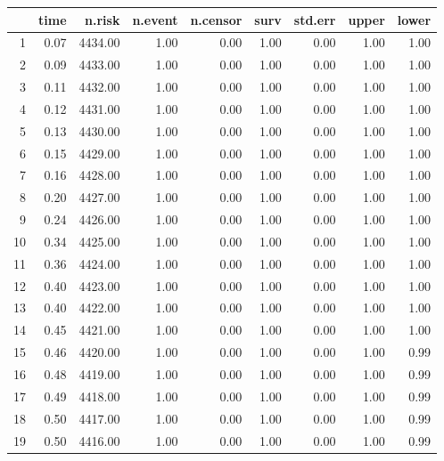 \documentclass{article}\usepackage[]{graphicx}\usepackage[]{color}
\makeatletter
\newenvironment{kframe}{%
 \def\at@end@of@kframe{}%
 \ifinner\ifhmode%
  \def\at@end@of@kframe{\end{minipage}}%
  \begin{minipage}{\columnwidth}%
 \fi\fi%
 \def\FrameCommand##1{\hskip\@totalleftmargin \hskip-\fboxsep
 \colorbox{shadecolor}{##1}\hskip-\fboxsep
     \hskip-\linewidth \hskip-\@totalleftmargin \hskip\columnwidth}%
 \MakeFramed {\advance\hsize-\width
   \@totalleftmargin\z@ \linewidth\hsize
   \@setminipage}}%
 {\par\unskip\endMakeFramed%
 \at@end@of@kframe}
\makeatother
\begin{document}
\begin{kframe}


{\ttfamily\noindent{}}\end{kframe}%
\begin{longtable}{rrrrrrrrr}
  \hline
 & time & n.risk & n.event & n.censor & surv & std.err & upper & lower \\ 
  \hline
1 & 0.07 & 4434.00 & 1.00 & 0.00 & 1.00 & 0.00 & 1.00 & 1.00 \\ 
  2 & 0.09 & 4433.00 & 1.00 & 0.00 & 1.00 & 0.00 & 1.00 & 1.00 \\ 
  3 & 0.11 & 4432.00 & 1.00 & 0.00 & 1.00 & 0.00 & 1.00 & 1.00 \\ 
  4 & 0.12 & 4431.00 & 1.00 & 0.00 & 1.00 & 0.00 & 1.00 & 1.00 \\ 
  5 & 0.13 & 4430.00 & 1.00 & 0.00 & 1.00 & 0.00 & 1.00 & 1.00 \\ 
  6 & 0.15 & 4429.00 & 1.00 & 0.00 & 1.00 & 0.00 & 1.00 & 1.00 \\ 
  7 & 0.16 & 4428.00 & 1.00 & 0.00 & 1.00 & 0.00 & 1.00 & 1.00 \\ 
  8 & 0.20 & 4427.00 & 1.00 & 0.00 & 1.00 & 0.00 & 1.00 & 1.00 \\ 
  9 & 0.24 & 4426.00 & 1.00 & 0.00 & 1.00 & 0.00 & 1.00 & 1.00 \\ 
  10 & 0.34 & 4425.00 & 1.00 & 0.00 & 1.00 & 0.00 & 1.00 & 1.00 \\ 
  11 & 0.36 & 4424.00 & 1.00 & 0.00 & 1.00 & 0.00 & 1.00 & 1.00 \\ 
  12 & 0.40 & 4423.00 & 1.00 & 0.00 & 1.00 & 0.00 & 1.00 & 1.00 \\ 
  13 & 0.40 & 4422.00 & 1.00 & 0.00 & 1.00 & 0.00 & 1.00 & 1.00 \\ 
  14 & 0.45 & 4421.00 & 1.00 & 0.00 & 1.00 & 0.00 & 1.00 & 1.00 \\ 
  15 & 0.46 & 4420.00 & 1.00 & 0.00 & 1.00 & 0.00 & 1.00 & 0.99 \\ 
  16 & 0.48 & 4419.00 & 1.00 & 0.00 & 1.00 & 0.00 & 1.00 & 0.99 \\ 
  17 & 0.49 & 4418.00 & 1.00 & 0.00 & 1.00 & 0.00 & 1.00 & 0.99 \\ 
  18 & 0.50 & 4417.00 & 1.00 & 0.00 & 1.00 & 0.00 & 1.00 & 0.99 \\ 
  19 & 0.50 & 4416.00 & 1.00 & 0.00 & 1.00 & 0.00 & 1.00 & 0.99 \\ 

\end{longtable}
\end{document}
